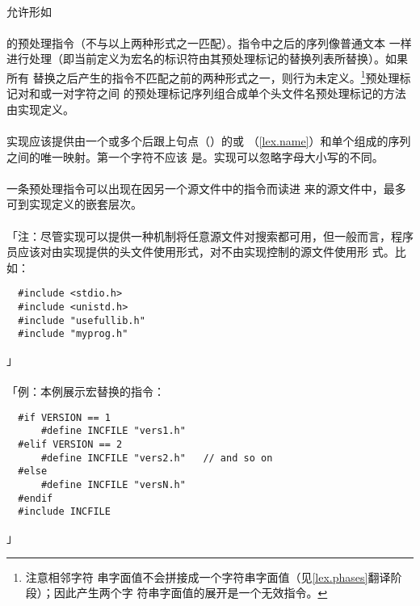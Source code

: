 \paragraph{}
允许形如                                                                      \\
\mbox{}                        \\
的预处理指令（不与以上两种形式之一匹配）。指令中之后的序列像普通文本
一样进行处理（即当前定义为宏名的标识符由其预处理标记的替换列表所替换）。如果所有
替换之后产生的指令不匹配之前的两种形式之一，则行为未定义。\footnote{注意相邻字符
串字面值不会拼接成一个字符串字面值（见\ref{lex.phases}翻译阶段）；因此产生两个字
符串字面值的展开是一个无效指令。}预处理标记对\tm{<}和\tm{>}或一对字符之间
的预处理标记序列组合成单个头文件名预处理标记的方法由实现定义。

\paragraph{}
实现应该提供由一个或多个后跟上句点（）的或
（\ref{lex.name}）和单个组成的序列之间的唯一映射。第一个字符不应该
是。实现可以忽略字母大小写的不同。

\paragraph{}
一条预处理指令可以出现在因另一个源文件中的指令而读进
来的源文件中，最多可到实现定义的嵌套层次。

\paragraph{}
「注：尽管实现可以提供一种机制将任意源文件对\tm{< >}搜索都可用，但一般而言，程序
员应该对由实现提供的头文件使用\tm{< >}形式，对不由实现控制的源文件使用形
式。比如：
\begin{lstlisting}
  #include <stdio.h>
  #include <unistd.h>
  #include "usefullib.h"
  #include "myprog.h"
\end{lstlisting}」

\paragraph{}
「例：本例展示宏替换的指令：
\begin{lstlisting}
  #if VERSION == 1
      #define INCFILE "vers1.h"
  #elif VERSION == 2
      #define INCFILE "vers2.h"   // and so on
  #else
      #define INCFILE "versN.h"
  #endif
  #include INCFILE
\end{lstlisting}」

